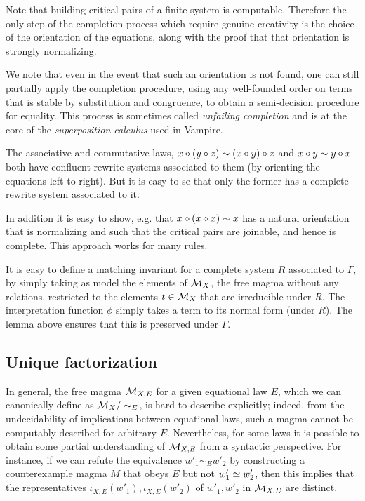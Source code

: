 Note that building critical pairs of a finite system is computable. Therefore the only step of the completion process which require genuine creativity is the choice of the orientation of the equations, along with the proof that that orientation is strongly normalizing.

We note that even in the event that such an orientation is not found, one can still partially apply the completion procedure, using any well-founded order on terms that is stable by substitution and congruence, to obtain a semi-decision procedure for equality. This process is sometimes called \emph{unfailing completion} and is at the core of the \emph{superposition calculus} used in Vampire.

The associative and commutative laws, $x \diamond (y \diamond z) \sim (x \diamond y) \diamond z$ and $x \diamond y \sim y \diamond x$ both have confluent rewrite systems associated to them (by orienting the equations left-to-right). But it is easy to se that only the former has a complete rewrite system associated to it.

In addition it is easy to show, e.g. that $x \diamond (x \diamond x) \sim x$ has a natural orientation that is normalizing and such that the critical pairs are joinable, and hence is complete. This approach works for many rules.

It is easy to define a matching invariant for a complete system $R$ associated to $\Gamma$, by simply taking as model the elements of ${\mathcal{M}}_{X}$, the free magma without any relations, restricted to the elements $t \in {\mathcal{M}}_{X}$ that are irreducible under $R$. The interpretation function $\phi$ simply takes a term to its normal form (under $R$). The lemma above ensures that this is preserved under $\Gamma$.

\subsection{Unique factorization}

In general, the free magma ${\mathcal{M}}_{X,E}$ for a given equational law $E$, which we can canonically define as ${\mathcal{M}}_X / \sim_E$, is hard to describe explicitly; indeed, from the undecidability of implications between equational laws, such a magma cannot be computably described for arbitrary $E$.  Nevertheless, for some laws it is possible to obtain some partial understanding of ${\mathcal{M}}_{X,E}$ from a syntactic perspective.  For instance, if we can refute the equivalence $w'_1 \sim_E w'_2$ by constructing a counterexample magma $M$ that obeys $E$ but not $w'_1 \simeq w'_2$, then this implies that the representatives $\iota_{X,E}(w'_1), \iota_{X,E}(w'_2)$ of  $w'_1, w'_2$ in ${\mathcal{M}}_{X,E}$ are distinct.

